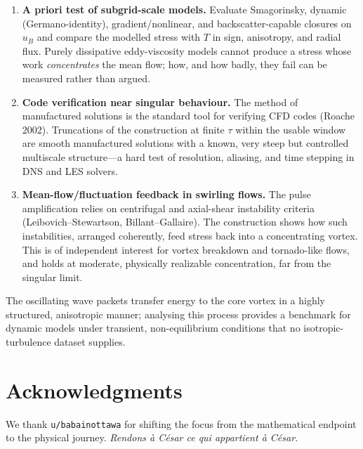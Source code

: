 \documentclass[11pt]{article}
\begin{document}
\begin{enumerate}
    \item \textbf{A priori test of subgrid-scale models.} Evaluate Smagorinsky, dynamic (Germano-identity), gradient/nonlinear, and backscatter-capable closures on $u_B$ and compare the modelled stress with $T$ in sign, anisotropy, and radial flux. Purely dissipative eddy-viscosity models cannot produce a stress whose work \emph{concentrates} the mean flow; how, and how badly, they fail can be measured rather than argued.
    \item \textbf{Code verification near singular behaviour.} The method of manufactured solutions is the standard tool for verifying CFD codes (Roache 2002). Truncations of the construction at finite $\tau$ within the usable window are smooth manufactured solutions with a known, very steep but controlled multiscale structure---a hard test of resolution, aliasing, and time stepping in DNS and LES solvers.
    \item \textbf{Mean-flow/fluctuation feedback in swirling flows.} The pulse amplification relies on centrifugal and axial-shear instability criteria (Leibovich--Stewartson, Billant--Gallaire). The construction shows how such instabilities, arranged coherently, feed stress back into a concentrating vortex. This is of independent interest for vortex breakdown and tornado-like flows, and holds at moderate, physically realizable concentration, far from the singular limit.
\end{enumerate}

The oscillating wave packets transfer energy to the core vortex in a highly structured, anisotropic manner; analysing this process provides a benchmark for dynamic models under transient, non-equilibrium conditions that no isotropic-turbulence dataset supplies.

\section{Acknowledgments}
We thank \texttt{u/babainottawa} for shifting the focus from the mathematical endpoint to the physical journey. \textit{Rendons \`a C\'esar ce qui appartient \`a C\'esar.}
\end{document}
